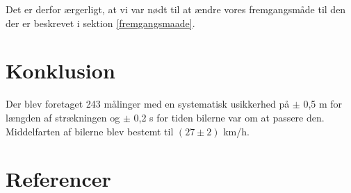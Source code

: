 \documentclass[hidelinks]{article}
\begin{document}
Det er derfor ærgerligt, at vi var nødt til at ændre vores fremgangsmåde til den der er beskrevet i sektion \ref{fremgangsmaade}.

\section{Konklusion}

Der blev foretaget 243 målinger med en systematisk usikkerhed på $\pm$ 0,5 m for længden af strækningen og $\pm$ 0,2 s for tiden bilerne var om at passere den.\\

Middelfarten af bilerne blev bestemt til $(27 \pm 2)$ km/h.

\section{Referencer}
\printbibliography[
heading=none
]
\end{document}
